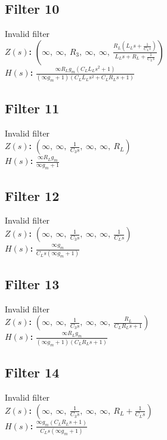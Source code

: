 \documentclass{article}
\begin{document}
\subsection*{Filter 10}
Invalid filter \\ 
\textbf{$Z(s)$:} $\left( \infty, \  \infty, \  R_{3}, \  \infty, \  \infty, \  \frac{R_{L} \left(L_{L} s + \frac{1}{C_{L} s}\right)}{L_{L} s + R_{L} + \frac{1}{C_{L} s}}\right)$ \\ 
\textbf{$H(s)$:} $\frac{\infty R_{L} g_{m} \left(C_{L} L_{L} s^{2} + 1\right)}{\left(\infty g_{m} + 1\right) \left(C_{L} L_{L} s^{2} + C_{L} R_{L} s + 1\right)}$ \\ 
\subsection*{Filter 11}
Invalid filter \\ 
\textbf{$Z(s)$:} $\left( \infty, \  \infty, \  \frac{1}{C_{3} s}, \  \infty, \  \infty, \  R_{L}\right)$ \\ 
\textbf{$H(s)$:} $\frac{\infty R_{L} g_{m}}{\infty g_{m} + 1}$ \\ 
\subsection*{Filter 12}
Invalid filter \\ 
\textbf{$Z(s)$:} $\left( \infty, \  \infty, \  \frac{1}{C_{3} s}, \  \infty, \  \infty, \  \frac{1}{C_{L} s}\right)$ \\ 
\textbf{$H(s)$:} $\frac{\infty g_{m}}{C_{L} s \left(\infty g_{m} + 1\right)}$ \\ 
\subsection*{Filter 13}
Invalid filter \\ 
\textbf{$Z(s)$:} $\left( \infty, \  \infty, \  \frac{1}{C_{3} s}, \  \infty, \  \infty, \  \frac{R_{L}}{C_{L} R_{L} s + 1}\right)$ \\ 
\textbf{$H(s)$:} $\frac{\infty R_{L} g_{m}}{\left(\infty g_{m} + 1\right) \left(C_{L} R_{L} s + 1\right)}$ \\ 
\subsection*{Filter 14}
Invalid filter \\ 
\textbf{$Z(s)$:} $\left( \infty, \  \infty, \  \frac{1}{C_{3} s}, \  \infty, \  \infty, \  R_{L} + \frac{1}{C_{L} s}\right)$ \\ 
\textbf{$H(s)$:} $\frac{\infty g_{m} \left(C_{L} R_{L} s + 1\right)}{C_{L} s \left(\infty g_{m} + 1\right)}$ \\ 
\end{document}
